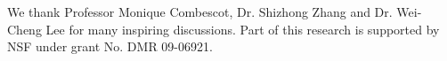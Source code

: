 \documentclass[reprint,pra]{revtex4-1}
\begin{document}
\begin{acknowledgements}
We thank  Professor Monique Combescot, Dr. Shizhong Zhang and  Dr. Wei-Cheng Lee for many inspiring discussions. Part of this research  is supported  by NSF under grant No. DMR 09-06921. 
\end{acknowledgements}

\end{document}
